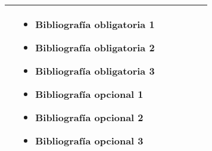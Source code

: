 \begin{landscape}
\begin{xltabular}{\linewidth}{XXXXXXX}
\begin{itemize}[label={}, labelsep=0pt, left=0pt .. 0pt, itemsep=1em]
        \end{itemize} &
        \begin{itemize}[label={}, labelsep=0pt, left=0pt .. 0pt, itemsep=1em] %
            \item Bibliografía obligatoria 1
            \item Bibliografía obligatoria 2
            \item Bibliografía obligatoria 3
            \item Bibliografía opcional 1
            \item Bibliografía opcional 2
            \item Bibliografía opcional 3
        \end{itemize}\\
        \bottomrule
    \end{xltabular}
\end{landscape}